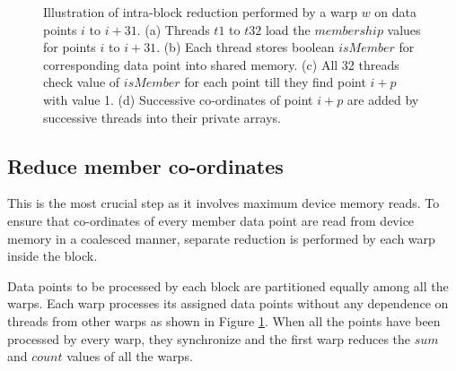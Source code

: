 \begin{figure}[h]
	\centerline{
	}
	\caption{Illustration of intra-block reduction performed by a warp $w$ on data points $i$ to $i+31$. (a) Threads $t1$ to $t32$ load the $membership$ values for points $i$ to $i+31$. (b) Each thread stores boolean $isMember$ for corresponding data point into shared memory. (c) All 32 threads check value of $isMember$ for each point till they find point $i+p$ with value 1. (d) Successive co-ordinates of point $i+p$ are added by successive threads into their private arrays.}
\label{fig:redcn}
\end{figure}

\subsection{Reduce member co-ordinates}
This is the most crucial step as it involves maximum device memory reads. To ensure that co-ordinates of every member data point are read from device memory in a coalesced manner, separate reduction is performed by each warp inside the block. 

Data points to be processed by each block are partitioned equally among all the warps. Each warp processes its assigned data points without any dependence on threads from other warps as shown in Figure \ref{fig:redcn}. When all the points have been processed by every warp, they synchronize and the first warp reduces the $sum$ and $count$ values of all the warps.

